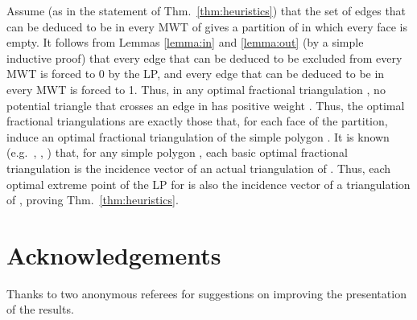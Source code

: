 \documentclass[final]{siamltex}
\begin{document}
Assume (as in the statement of Thm.~\ref{thm:heuristics}) that the set  of edges
that can be deduced to be in every MWT of  
gives a partition of  in which every face is empty.
It follows from Lemmas \ref{lemma:in} and \ref{lemma:out}
(by a simple inductive proof) that every edge that can be deduced to be excluded from every MWT
is forced to 0 by the LP, and every edge that can be deduced to be in every MWT is forced to 1.
Thus, in any optimal fractional triangulation ,
no potential triangle  that crosses an edge in  has positive weight .
Thus, the optimal fractional triangulations  are exactly those that,
for each face  of the partition, induce an optimal fractional triangulation 
of the simple polygon .
It is known
(e.g.~\cite[Thm.~7]{dantzig1985triangulations},
\cite[Thm.~4.1(i)]{de1996polytope},
\cite[Cor.~3.6.2]{kirsanov2004minimal})
that, for any simple polygon , each basic optimal fractional triangulation
is the incidence vector of an actual triangulation of .
Thus, each optimal extreme point of the LP for  is also the incidence vector
of a triangulation of , proving Thm.~\ref{thm:heuristics}.



































\section{Acknowledgements}

Thanks to two anonymous referees for suggestions on improving the presentation of the results.



\end{document}
